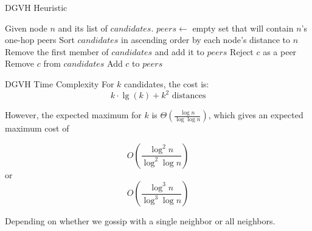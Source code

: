 \documentclass[11pt]{beamer}
\begin{document}
\begin{frame}{DGVH Heuristic}
	
	\begin{algorithmic}[1]  %
		\STATE Given node $n$ and its list of $candidates$.
		\STATE $peers \leftarrow$ empty set that will contain $n$'s one-hop peers
		\STATE Sort $candidates$ in ascending order by each node's distance to $n$
		\STATE Remove the first member of $candidates$ and add it to $peers$
		\STATE Reject $c$ as a peer
		\ELSE
		\STATE Remove $c$ from $candidates$
		\STATE Add $c$ to $peers$
		\ENDIF
		\ENDFOR
	\end{algorithmic}
	
\end{frame}





\begin{frame}{DGVH Time Complexity}
	For $ k $ candidates, the cost is: 
	\[ k\cdot\lg(k)  + k^{2} \text{ distances} \]
	
	However, the expected maximum for $k$ is $\Theta(\frac{\log n}{\log \log n} )$, which gives an expected maximum cost of 
	
	\[ O(\frac{\log^{2} n}{\log^{2} \log n} ) \]
	or
	\[O(\frac{\log^{3} n}{\log^{3} \log n} )\]
	
	Depending on whether we gossip with a single neighbor or all neighbors.
	
\end{frame}
\end{document}
